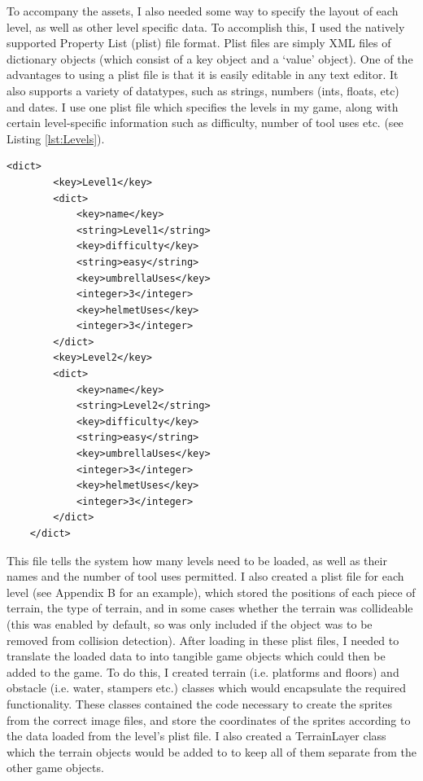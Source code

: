 \documentclass[a4paper,oneside]{report}
\begin{document}
To accompany the assets, I also needed some way to specify the layout of each level, as well as other level specific data. To accomplish this, I used the natively supported Property List (plist) file format. Plist files are simply XML files of dictionary objects (which consist of a key object and a `value' object). One of the advantages to using a plist file is that it is easily editable in any text editor. It also supports a variety of datatypes, such as strings, numbers (ints, floats, etc) and dates. I use one plist file which specifies the levels in my game, along with certain level-specific information such as difficulty, number of tool uses etc. (see Listing \ref{lst:Levels}).
\newpage

\begin{lstlisting}[label={lst:Levels},caption=An Example Level List]
    <dict>
    	<key>Level1</key>
    	<dict>
    		<key>name</key>
    		<string>Level1</string>
    		<key>difficulty</key>
    		<string>easy</string>
    		<key>umbrellaUses</key>
    		<integer>3</integer>
    		<key>helmetUses</key>
    		<integer>3</integer>
    	</dict>
    	<key>Level2</key>
	    <dict>
    		<key>name</key>
    		<string>Level2</string>
    		<key>difficulty</key>
    		<string>easy</string>
    		<key>umbrellaUses</key>
    		<integer>3</integer>
    		<key>helmetUses</key>
    		<integer>3</integer>
    	</dict>
    </dict>
\end{lstlisting}

This file tells the system how many levels need to be loaded, as well as their names and the number of tool uses permitted. I also created a plist file for each level (see Appendix B for an example), which stored the positions of each piece of terrain, the type of terrain, and in some cases whether the terrain was collideable (this was enabled by default, so was only included if the object was to be removed from collision detection). After loading in these plist files, I needed to translate the loaded data to into tangible game objects which could then be added to the game. To do this, I created terrain (i.e. platforms and floors) and obstacle (i.e. water, stampers etc.) classes which would encapsulate the required functionality. These classes contained the code necessary to create the sprites from the correct image files, and store the coordinates of the sprites according to the data loaded from the level's plist file. I also created a TerrainLayer class which the terrain objects would be added to to keep all of them separate from the other game objects.
\end{document}
